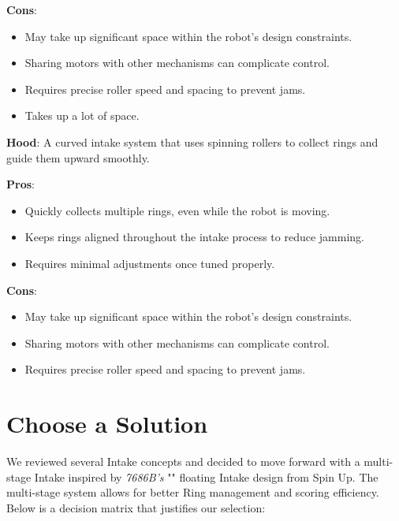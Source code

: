 \textbf{Cons}:
\begin{itemize}
    \item May take up significant space within the robot's design constraints.
    \item Sharing motors with other mechanisms can complicate control.
    \item Requires precise roller speed and spacing to prevent jams.
    \item Takes up a lot of space.
\end{itemize}
\noindent
\textbf{Hood}:
A curved intake system that uses spinning rollers to collect rings and guide them upward smoothly.

\noindent
\textbf{Pros}:
\begin{itemize}
    \item Quickly collects multiple rings, even while the robot is moving.
    \item Keeps rings aligned throughout the intake process to reduce jamming.
    \item Requires minimal adjustments once tuned properly.
\end{itemize}

\textbf{Cons}:
\begin{itemize}
    \item May take up significant space within the robot's design constraints.
    \item Sharing motors with other mechanisms can complicate control.
    \item Requires precise roller speed and spacing to prevent jams.
\end{itemize}


\section*{Choose a Solution}
We reviewed several Intake concepts and decided to move forward with a multi-stage Intake inspired by \textit{7686B's} "\cite{7686b}"  floating Intake design from Spin Up. The multi-stage system allows for better Ring management and scoring efficiency. Below is a decision matrix that justifies our selection:

